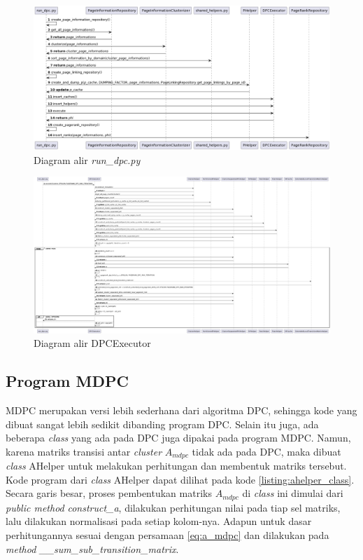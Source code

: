 \begin{figure}[H]
\centering
\includegraphics[width={\textheight}, height={\textwidth}, angle=270]{gambar/run_dpc_sequence_diagram}
\caption{Diagram alir \textit{run\_dpc.py}}
\label{gambar:run_dpc_sequence_diagram}
\end{figure}

\begin{figure}[H]
\centering
\includegraphics[width={\textheight}, height={\textwidth}, angle=270]{gambar/dpc_executor_sequence_diagram}
\caption{Diagram alir DPCExecutor}
\label{gambar:dpc_executor_sequence_diagram}
\end{figure}

\subsection{Program MDPC}

MDPC merupakan versi lebih sederhana dari algoritma DPC, sehingga kode yang dibuat sangat lebih sedikit dibanding program DPC. Selain itu juga, ada beberapa \textit{class} yang ada pada DPC juga dipakai pada program MDPC. Namun, karena matriks transisi antar \textit{cluster} $A_{mdpc}$ tidak ada pada DPC, maka dibuat \textit{class} AHelper untuk melakukan perhitungan dan membentuk matriks tersebut. Kode program dari \textit{class} AHelper dapat dilihat pada kode \ref{listing:ahelper_class}. Secara garis besar, proses pembentukan matriks $A_{mdpc}$ di \textit{class} ini dimulai dari \textit{public method} \textit{construct\_a}, dilakukan perhitungan nilai pada tiap sel matriks, lalu dilakukan normalisasi pada setiap kolom-nya. Adapun untuk dasar perhitungannya sesuai dengan persamaan \ref{eq:a_mdpc} dan dilakukan pada \textit{method \_\_sum\_sub\_transition\_matrix}.


